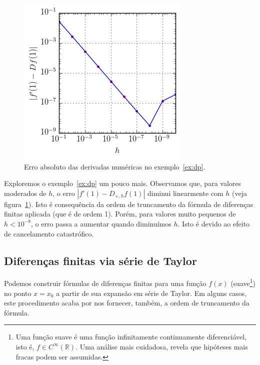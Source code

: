 \begin{figure}
  \centering
  \includegraphics{./cap_derivacao/pics/ex_derivacao/ex_derivacao}
  \caption{Erro absoluto das derivadas numéricas no exemplo~\ref{ex:dp}.}
  \label{fig:ex_derivacao}
\end{figure}

Exploremos o exemplo~\ref{ex:dp} um pouco mais. Observamos que, para valores moderados de $h$, o erro $|f'(1)-D_{+,h}f(1)|$ diminui linearmente com $h$ (veja figura~\ref{fig:ex_derivacao}). Isto é consequência da ordem de truncamento da fórmula de diferenças finitas aplicada (que é de ordem 1). Porém, para valores muito pequenos de $h < 10^{-8}$, o erro passa a aumentar quando diminuímos $h$. Isto é devido ao efeito de cancelamento catastrófico.

\subsection{Diferenças finitas via série de Taylor}

Podemos construir fórmulas de diferenças finitas para uma função $f(x)$ (suave\footnote{Uma função suave é uma função infinitamente continuamente diferenciável, isto é, $f\in C^\infty(\mathbb{R})$. Uma análise mais cuidadosa, revela que hipóteses mais fracas podem ser assumidas.}) no ponto $x = x_0$ a partir de sua expansão em série de Taylor. Em alguns casos, este procedimento acaba por nos fornecer, também, a ordem de truncamento da fórmula.


